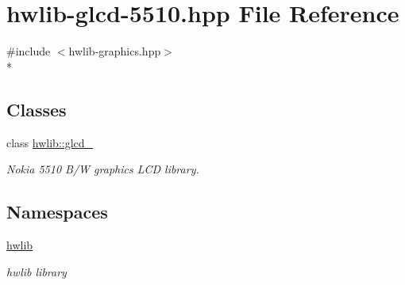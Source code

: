\hypertarget{hwlib-glcd-5510_8hpp}{}\section{hwlib-\/glcd-\/5510.hpp File Reference}
\label{hwlib-glcd-5510_8hpp}
{\ttfamily \#include $<$hwlib-\/graphics.\+hpp$>$}\\*
\subsection*{Classes}
\begin{DoxyCompactItemize}
\item 
class \hyperlink{classhwlib_1_1glcd__5510}{hwlib\+::glcd\+\_}
\begin{DoxyCompactList}\small\item\em Nokia 5510 B/W graphics L\+CD library. \end{DoxyCompactList}\end{DoxyCompactItemize}
\subsection*{Namespaces}
\begin{DoxyCompactItemize}
\item 
 \hyperlink{namespacehwlib}{hwlib}
\begin{DoxyCompactList}\small\item\em hwlib library \end{DoxyCompactList}\end{DoxyCompactItemize}
